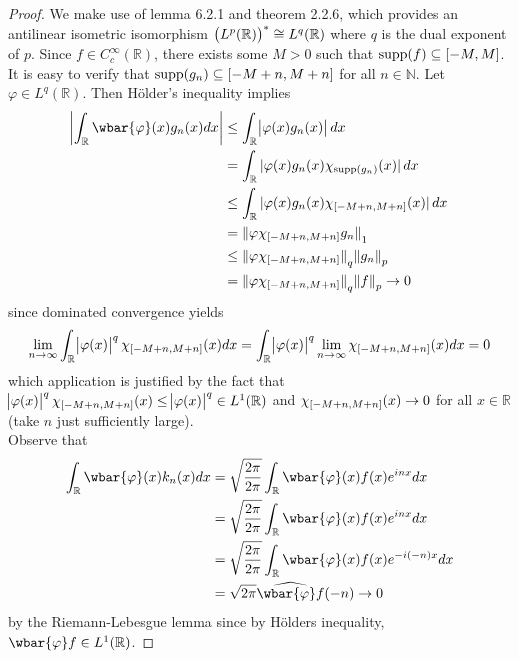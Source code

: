 \begin{enumerate}[label = \textbf{Exercise \arabic*.},wide = 0pt, itemsep = 1.5ex]
		\begin{proof}
			We make use of lemma 6.2.1 and theorem 2.2.6, which provides an antilinear isometric isomorphism $\del[1]{L^p(\mathbb{R})}^* \cong L^q(\mathbb{R})$ where $q$ is the dual exponent of $p$. Since $f \in C_c^\infty(\mathbb{R})$, there exists some $M > 0$ such that $\supp(f) \subseteq \intcc{-M,M}$. It is easy to verify that $\supp(g_n) \subseteq \intcc{-M + n, M + n}$ for all $n \in \mathbb{N}$. Let $\varphi \in L^q(\mathbb{R})$. Then H\"older's inequality implies  
			\begin{align*}
				\abs[3]{\int_\mathbb{R} \wbar{\varphi}(x)g_n(x)dx} &\leq \int_\mathbb{R} \abs{\varphi(x)g_n(x)}dx\\
				&= \int_\mathbb{R} \abs[0]{\varphi(x)g_n(x)\chi_{\supp(g_n)}(x)}dx\\
				&\leq \int_\mathbb{R}\abs[0]{\varphi(x)g_n(x)\chi_{\intcc{-M + n,M + n}}(x)}dx\\
				&= \norm[0]{\varphi \chi_{\intcc{-M + n,M + n}}g_n}_1\\
				&\leq \norm[0]{\varphi\chi_{\intcc{-M+n,M+n}}}_q\norm{g_n}_p\\
				&=\norm[0]{\varphi\chi_{\intcc{-M+n,M+n}}}_q\norm{f}_p \to 0
			\end{align*}
			\noindent since dominated convergence yields
			\begin{equation*}
				\lim_{n \to \infty} \int_\mathbb{R} \abs{\varphi(x)}^q \chi_{\intcc{-M + n,M + n}}(x) dx = \int_\mathbb{R} \abs{\varphi(x)}^q \lim_{n \to \infty}\chi_{\intcc{-M + n,M + n}}(x) dx = 0
			\end{equation*}
			\noindent which application is justified by the fact that $ \abs{\varphi(x)}^q \chi_{\intcc{-M + n,M + n}}(x) \leq \abs{\varphi(x)}^q \in L^1(\mathbb{R})$ and $\chi_{\intcc{-M + n,M + n}}(x) \to 0$ for all $x \in \mathbb{R}$ (take $n$ just sufficiently large).\\
			Observe that
			\begin{align*}
				\int_\mathbb{R} \wbar{\varphi}(x)k_n(x)dx &= \sqrt{\frac{2\pi}{2\pi}} \int_\mathbb{R} \wbar{\varphi}(x)f(x)e^{inx}dx\\
				&= \sqrt{\frac{2\pi}{2\pi}} \int_\mathbb{R} \wbar{\varphi}(x)f(x)e^{inx}dx\\
				&= \sqrt{\frac{2\pi}{2\pi}} \int_\mathbb{R} \wbar{\varphi}(x)f(x)e^{-i(-n)x}dx\\
				&= \sqrt{2\pi} \widehat{\wbar{\varphi}f}(-n) \to 0
			\end{align*}
			\noindent by the Riemann-Lebesgue lemma since by H\"olders inequality, $\wbar{\varphi}f \in L^1(\mathbb{R})$.
		\end{proof}


\end{enumerate}
